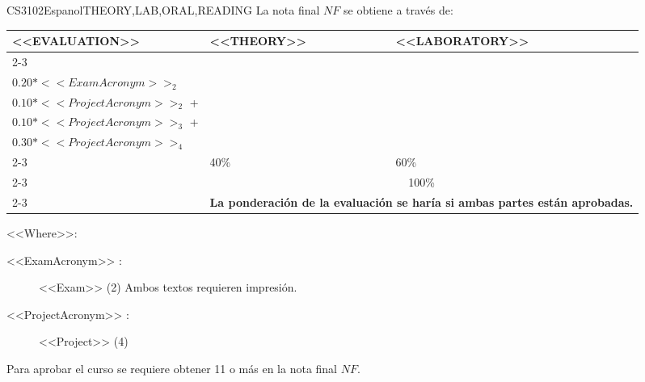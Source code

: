   \begin{evaluation}{CS3102}{Espanol}{THEORY,LAB,ORAL,READING}
  La nota final $NF$ se obtiene a través de: 

  \begin{tabularx}{0.9\textwidth}{|X|p{}|p{}|} \hline
  \multirow{4}{*}{\uppercase{<<Evaluation>>}} & \uppercase{<<Theory>>} & \uppercase{<<Laboratory>>} \\ \cline{2-3}
  & %
      \begin{minipage}{0.95\textwidth}
      \begin{tabular}{l}
        $0.20*<<ExamAcronym>>_{1}$  + \\
        $0.20*<<ExamAcronym>>_{2}$ 
      \end{tabular} 
      \end{minipage} 
  & %
      \begin{minipage}{0.95\textwidth}
      \begin{tabular}{l}
        $0.10*<<ProjectAcronym>>_{1}$  + \\
        $0.10*<<ProjectAcronym>>_{2}$  + \\
        $0.10*<<ProjectAcronym>>_{3}$  + \\
        $0.30*<<ProjectAcronym>>_{4}$
      \end{tabular} 
      \end{minipage}                 \\ \cline{2-3}
  
  & %
  40\% 
  & %
  60\% \\ \cline{2-3}
  & \multicolumn{2}{c|}{100\%}  \\ \cline{2-3}
  & \multicolumn{2}{c|}{\textbf{La ponderación de la evaluación se haría si ambas partes están aprobadas.}}  \\ \hline
  \end{tabularx}
    
  \vspace{2mm}
  \noindent <<Where>>:
  \begin{description}
      \item[<<ExamAcronym>> :] <<Exam>> (2) Ambos textos requieren impresión.
      \item[<<ProjectAcronym>> :] <<Project>> (4)
  \end{description}

  \noindent Para aprobar el curso se requiere obtener 11 o más en la nota final $NF$.
  \end{evaluation}


